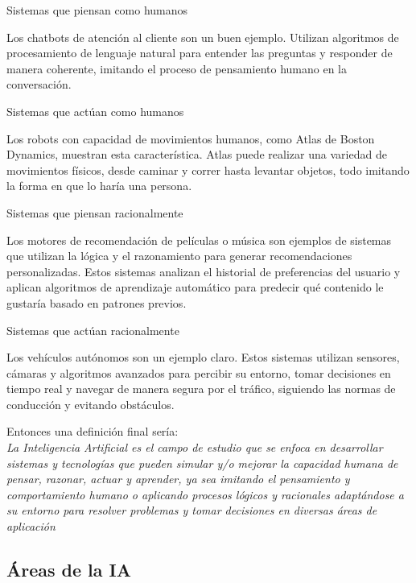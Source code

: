 \begin{myitemize}
    \item Sistemas que piensan como humanos
    
    Los chatbots de atención al cliente son un buen ejemplo. Utilizan algoritmos 
    de procesamiento de lenguaje natural para entender las preguntas y responder 
    de manera coherente, imitando el proceso de pensamiento humano en la conversación.

    \item Sistemas que actúan como humanos
    
    Los robots con capacidad de movimientos humanos, como Atlas de Boston Dynamics, 
    muestran esta característica. Atlas puede realizar una variedad de movimientos 
    físicos, desde caminar y correr hasta levantar objetos, todo imitando la forma 
    en que lo haría una persona. \cite{rtatlas}

    \item Sistemas que piensan racionalmente
    
    Los motores de recomendación de películas o música son ejemplos de sistemas que 
    utilizan la lógica y el razonamiento para generar recomendaciones personalizadas. 
    Estos sistemas analizan el historial de preferencias del usuario y aplican 
    algoritmos de aprendizaje automático para predecir qué contenido le gustaría 
    basado en patrones previos.
    

    \item Sistemas que actúan racionalmente
    
    Los vehículos autónomos son un ejemplo claro. Estos sistemas utilizan sensores, 
    cámaras y algoritmos avanzados para percibir su entorno, tomar decisiones en 
    tiempo real y navegar de manera segura por el tráfico, siguiendo las normas de 
    conducción y evitando obstáculos.
\end{myitemize}


Entonces una definición final sería:\\

\textit{La Inteligencia Artificial es el campo de estudio que se enfoca en 
desarrollar sistemas y tecnologías que pueden simular y/o mejorar la capacidad 
humana de pensar, razonar, actuar y aprender, ya sea imitando el pensamiento 
y comportamiento humano o aplicando procesos lógicos y racionales adaptándose 
a su entorno para resolver problemas y tomar decisiones en diversas 
áreas de aplicación}

\subsection*{Áreas de la IA}

